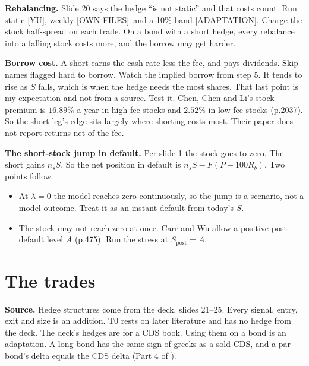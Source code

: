 \documentclass[10pt,a4paper]{article}
\newcommand{\YU}{\textsf{\footnotesize\textcolor{tagother}{[YU]}}}
\newcommand{\OWN}{\textsf{\footnotesize\textcolor{tagother}{[OWN FILES]}}}
\newcommand{\ADAPT}{\textsf{\footnotesize\textcolor{tagadapt}{[ADAPTATION]}}}
\begin{document}
\textbf{Rebalancing.} Slide 20 says the hedge ``is not static'' and that costs count. Run static \YU, weekly \OWN\ and a 10\% band \ADAPT. Charge the stock half-spread on each trade. On a bond with a short hedge, every rebalance into a falling stock costs more, and the borrow may get harder.

\textbf{Borrow cost.} A short earns the cash rate less the fee, and pays dividends. Skip names flagged hard to borrow. Watch the implied borrow from step 5. It tends to rise as $S$ falls, which is when the hedge needs the most shares. That last point is my expectation and not from a source. Test it. Chen, Chen and Li's stock premium is $16.89\%$ a year in high-fee stocks and $2.52\%$ in low-fee stocks (p.2037). So the short leg's edge sits largely where shorting costs most. Their paper does not report returns net of the fee.

\textbf{The short-stock jump in default.} Per slide 1 the stock goes to zero. The short gains $n_sS$. So the net position in default is $n_sS-F(P-100R_b)$. Two points follow.
\begin{itemize}[nosep]
\item At $\lambda=0$ the model reaches zero continuously, so the jump is a scenario, not a model outcome. Treat it as an instant default from today's $S$.
\item The stock may not reach zero at once. Carr and Wu allow a positive post-default level $A$ (p.475). Run the stress at $S_{\text{post}}=A$.
\end{itemize}

\section{The trades}\label{sec:trades}

\textbf{Source.} Hedge structures come from the deck, slides 21--25. Every signal, entry, exit and size is an addition. T0 rests on later literature and has no hedge from the deck. The deck's hedges are for a CDS book. Using them on a bond is an adaptation. A long bond has the same sign of greeks as a sold CDS, and a par bond's delta equals the CDS delta (Part 4 of ).
\end{document}
